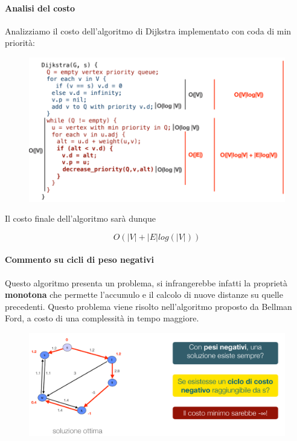 \documentclass{article}
\begin{document}
\newpage

\paragraph{Analisi del costo} Analizziamo il costo dell'algoritmo di Dijkstra implementato con coda di min priorità:

\begin{figure}[htbp]
        \center
        \includegraphics[scale=0.55]{img/dijkstra1.png}
    \end{figure}

Il costo finale dell'algoritmo sarà dunque

\begin{equation}
    O(|V|+|E|log(|V|))
\end{equation}

\paragraph{Commento su cicli di peso negativi} Questo algoritmo presenta un problema, si infrangerebbe infatti la proprietà \textbf{monotona} che permette l'accumulo e il calcolo di nuove distanze su quelle precedenti. Questo problema viene risolto nell'algoritmo proposto da Bellman Ford, a costo di una complessità in tempo maggiore.

\begin{figure}[htbp]
        \center
        \includegraphics[scale=0.45]{img/dijkstra2.png}
    \end{figure}
\end{document}
